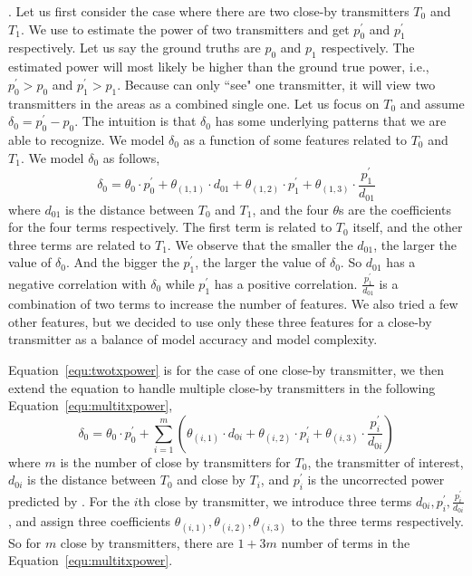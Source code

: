 .
Let us first consider the case where there are two close-by transmitters $T_0$ and $T_1$. We use \power to estimate the power of two transmitters and get $p_0^{'}$ and $p_1^{'}$ respectively.
Let us say the ground truths are $p_0$ and $p_1$ respectively.
The estimated power will most likely be higher than the ground true power, i.e., $p_0^{'} > p_0$ and $p_1^{'} > p_1$.
Because \power can only ``see" one transmitter, it will view two transmitters in the areas as a combined single one.
Let us focus on $T_0$  and assume $\delta_0 = p_0^{'} - p_0$.
The intuition is that $\delta_0$ has some underlying patterns that we are able to recognize.
We model $\delta_0$ as a function of some features related to $T_0$ and $T_1$.
We model $\delta_0$ as follows,
\begin{equation}
  \delta_0 =   \theta_0 \cdot p_0^{'} + \theta_{(1,1)} \cdot d_{01} + \theta_{(1,2)} \cdot p_1^{'} + \theta_{(1,3)} \cdot \frac{p_1^{'}}{d_{01}} 
  \label{equ:twotxpower}
\end{equation}
where $d_{01}$ is the distance between $T_0$ and $T_1$, and the four $\theta$s are the coefficients for the four terms respectively.
The first term is related to $T_0$ itself, and the other three terms are related to $T_1$.
We observe that the smaller the $d_{01}$, the larger the value of $\delta_0$.
And the bigger the $p_{1}^{'}$, the larger the value of $\delta_0$.
So $d_{01}$ has a negative correlation with $\delta_0$ while $p_{1}^{'}$ has a positive correlation.
$\frac{p_1^{'}}{d_{01}}$ is a combination of two terms to increase the number of features.
We also tried a few other features, but we decided to use only these three features for a close-by transmitter as a balance of model accuracy and model complexity.

Equation~\ref{equ:twotxpower} is for the case of one close-by transmitter, we then extend the equation to handle multiple close-by transmitters in the following Equation~\ref{equ:multitxpower},
\begin{equation}
  \delta_0 =  \theta_0 \cdot p_0^{'} + \sum_{i=1}^{m} ( \theta_{(i,1)} \cdot d_{0i} + \theta_{(i,2)} \cdot p_i^{'} + \theta_{(i,3)} \cdot \frac{p_i^{'}}{d_{0i}})
  \label{equ:multitxpower}
\end{equation}
where $m$ is the number of close by transmitters for $T_0$, the transmitter of interest, $d_{0i}$ is the distance between $T_0$ and close by $T_i$, and $p_i^{'}$ is the uncorrected power predicted by \power. 
For the $i$th close by transmitter, we introduce three terms $ d_{0i},  p_i^{'}, \frac{p_i^{'}}{d_{0i}}$, and assign three coefficients $ \theta_{(i,1)}, \theta_{(i,2)}, \theta_{(i,3)}$ to the three terms respectively.
So for $m$ close by transmitters, there are $1 + 3m$ number of terms in the Equation~\ref{equ:multitxpower}.

